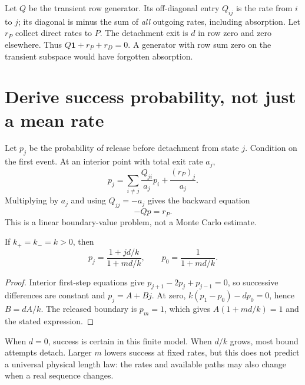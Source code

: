 
Let $Q$ be the transient row generator. Its off-diagonal entry $Q_{ij}$ is
the rate from $i$ to $j$; its diagonal is minus the sum of \emph{all} outgoing
rates, including absorption. Let $r_P$ collect direct rates to $P$. The
detachment exit is $d$ in row zero and zero elsewhere. Thus
$Q\boldsymbol 1+r_P+r_D=0$. A generator with row sum zero on the transient
subspace would have forgotten absorption.

\section{Derive success probability, not just a mean rate}
Let $p_j$ be the probability of release before detachment from state $j$.
Condition on the first event. At an interior point with total exit rate $a_j$,
\[
 p_j=\sum_{i\ne j}\frac{Q_{ji}}{a_j}p_i+\frac{(r_P)_j}{a_j}.
\]
Multiplying by $a_j$ and using $Q_{jj}=-a_j$ gives the backward equation
\begin{equation}
 -Qp=r_P.\label{eq:probability}
\end{equation}
This is a linear boundary-value problem, not a Monte Carlo estimate.

\begin{proposition}
If $k_+=k_-=k>0$, then
\begin{equation}
 p_j=\frac{1+jd/k}{1+md/k},\qquad p_0=\frac{1}{1+md/k}.
 \label{eq:closed}
\end{equation}
\end{proposition}
\begin{proof}
Interior first-step equations give $p_{j+1}-2p_j+p_{j-1}=0$, so successive
differences are constant and $p_j=A+Bj$. At zero,
$k(p_1-p_0)-dp_0=0$, hence $B=dA/k$. The released boundary is $p_m=1$,
which gives $A(1+md/k)=1$ and the stated expression.
\end{proof}
When $d=0$, success is certain in this finite model. When $d/k$ grows,
most bound attempts detach. Larger $m$ lowers success at fixed rates, but this
does not predict a universal physical length law: the rates and available
paths may also change when a real sequence changes.

